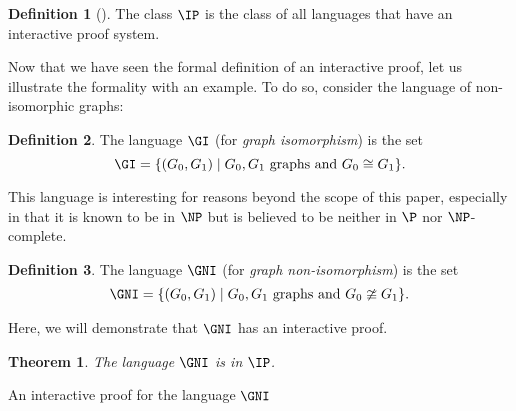 \documentclass[english,12pt]{reedthesis}
\theoremstyle{plain}
\newtheorem{thm}{Theorem}[section]
\theoremstyle{definition}
\newtheorem{defn}[defn]{Definition}
\theoremstyle{remark}
\DeclarePairedDelimiter{\abs}{\lvert}{\rvert}
\begin{document}
\begin{defn}[{\cite[Def.\ 4.2.5]{Go01}}]\label{def:ip}
  The class $\IP$ is the class of all languages that have an interactive proof
  system.
\end{defn}

Now that we have seen the formal definition of an interactive proof, let us
illustrate the formality with an example. To do so, consider the language of
non-isomorphic graphs:

\begin{defn}\label{def:gi}
  The language $\GI$ (for \emph{graph isomorphism}) is the set
  \[
    \GI = \{(G_{0}, G_{1}) \mid G_{0}, G_{1} \text{ graphs and } G_{0} \cong G_{1}\}.
  \]
\end{defn}

This language is interesting for reasons beyond the scope of this paper,
especially in that it is known to be in $\NP$ but is believed to be neither in
$\P$ nor $\NP$-complete.

\begin{defn}\label{def:gni}
  The language $\GNI$ (for \emph{graph non-isomorphism}) is the set
  \[
    \GNI = \{(G_{0}, G_{1}) \mid G_{0}, G_{1} \text{ graphs and } G_{0} \ncong G_{1}\}.
  \]
\end{defn}

Here, we will demonstrate that $\GNI$ has an interactive proof.

\begin{thm}\label{thm:gni-ip}
  The language $\GNI$ is in $\IP$.
\end{thm}

\begin{algorithm}[htbp]
  \Accept\;
  \caption{An interactive proof for the language $\GNI$}\label{alg:gni-ip}
\end{algorithm}
\end{document}
